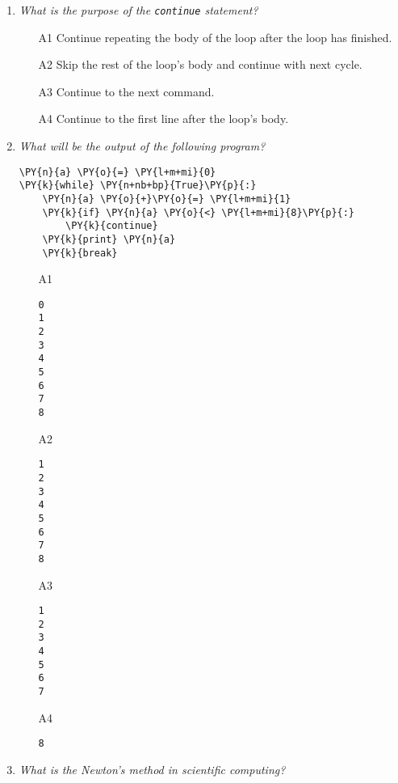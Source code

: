 \begin{enumerate}
\vspace{6mm}

\item {\em What is the purpose of the {\tt continue} statement?}\\

\begin{enumerate}
\item[A1] Continue repeating the body of the loop after the loop has finished.
\item[A2] Skip the rest of the loop's body and continue with next cycle.
\item[A3] Continue to the next command.
\item[A4] Continue to the first line after the loop's body.
\end{enumerate}

\vspace{6mm}

\item {\em What will be the output of the following program?}\\

\begin{Verbatim}[commandchars=\\\{\}]
\PY{n}{a} \PY{o}{=} \PY{l+m+mi}{0}
\PY{k}{while} \PY{n+nb+bp}{True}\PY{p}{:}
    \PY{n}{a} \PY{o}{+}\PY{o}{=} \PY{l+m+mi}{1}
    \PY{k}{if} \PY{n}{a} \PY{o}{<} \PY{l+m+mi}{8}\PY{p}{:}
        \PY{k}{continue}
    \PY{k}{print} \PY{n}{a}
    \PY{k}{break}
\end{Verbatim}
\begin{enumerate}
\item[A1] 
\begin{verbatim}
0
1
2
3
4
5
6
7
8
\end{verbatim}
\item[A2] 
\begin{verbatim}
1
2
3
4
5
6
7
8
\end{verbatim}
\item[A3] 
\begin{verbatim}
1
2
3
4
5
6
7
\end{verbatim}
\item[A4] 
\begin{verbatim}
8
\end{verbatim}
\end{enumerate}

\vspace{6mm}

\item {\em What is the Newton's method in scientific computing?}\\


\end{enumerate}

